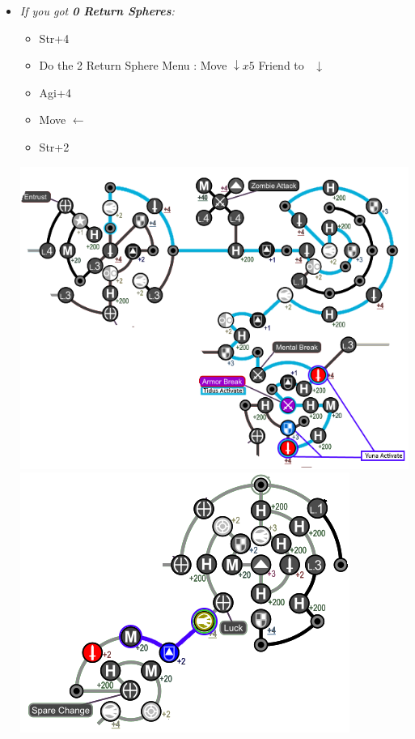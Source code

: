 \begin{spheregrid}
\begin{multicols}{2}
\begin{itemize}
\begin{itemize}
              \columnbreak
        \item \textit{If you got \textbf{0 Return Spheres}:}
                \begin{itemize}
                \tidusf Move to Armor Break $\rightarrow x3, \downarrow x6$
                \tidusf Armor Break
                \tidusf Move to HP $\searrow\searrow$
                      \yunaf Friend Sphere to \tidus
                \item Str+4
                \item Do the 2 Return Sphere Menu
                \rikkuf: Move $\downarrow x5$
                \yunaf Friend to \rikku\ $\downarrow$
                \item Agi+4
                \item Move $\leftarrow$
                \item Str+2
              \end{itemize}
              \includegraphics[width=.9\columnwidth]{graphics/0_returns}
              \includegraphics[width=.7\columnwidth]{graphics/0_returns_pt2}

\end{itemize}
\end{itemize}
\end{multicols}
\end{spheregrid}
